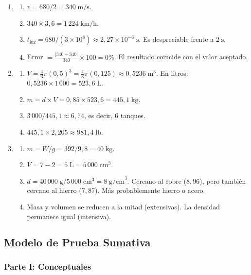 \documentclass[12pt, letterpaper]{article}
\begin{document}
\begin{enumerate}[leftmargin=*, label=\textbf{\arabic*.}]
  \item \begin{enumerate}[label=\alph*)]
    \item $v = 680/2 = 340\;\text{m/s}$.
    \item $340 \times 3{,}6 = 1\,224\;\text{km/h}$.
    \item $t_{\text{luz}} = 680/(3 \times 10^8) \approx 2{,}27 \times 10^{-6}\;\text{s}$. Es despreciable frente a $2\;\text{s}$.
    \item Error $= \frac{|340 - 340|}{340} \times 100 = 0\%$. El resultado coincide con el valor aceptado.
  \end{enumerate}

  \item \begin{enumerate}[label=\alph*)]
    \item $V = \frac{4}{3}\pi(0{,}5)^3 = \frac{4}{3}\pi(0{,}125) \approx 0{,}5236\;\text{m}^3$. En litros: $0{,}5236 \times 1\,000 = 523{,}6\;\text{L}$.
    \item $m = d \times V = 0{,}85 \times 523{,}6 = 445{,}1\;\text{kg}$.
    \item $3\,000/445{,}1 \approx 6{,}74$, es decir, 6 tanques.
    \item $445{,}1 \times 2{,}205 \approx 981{,}4\;\text{lb}$.
  \end{enumerate}

  \item \begin{enumerate}[label=\alph*)]
    \item $m = W/g = 392/9{,}8 = 40\;\text{kg}$.
    \item $V = 7 - 2 = 5\;\text{L} = 5\,000\;\text{cm}^3$.
    \item $d = 40\,000\;\text{g}/5\,000\;\text{cm}^3 = 8\;\text{g/cm}^3$. Cercano al cobre ($8{,}96$), pero también cercano al hierro ($7{,}87$). Más probablemente hierro o acero.
    \item Masa y volumen se reducen a la mitad (extensivas). La densidad permanece igual (intensiva).
  \end{enumerate}
\end{enumerate}

\subsection*{Modelo de Prueba Sumativa}

\subsubsection*{Parte I: Conceptuales}
\end{document}
